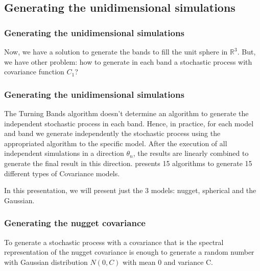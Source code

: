 \documentclass{beamer}
\begin{document}
\subsection{Generating the unidimensional simulations}

\begin{frame}
 \frametitle{Generating the unidimensional simulations}
 Now, we have a solution to generate the bands to fill the unit sphere in $\mathbb{R}^3$. But, we have other problem:
 how to generate in each band a stochastic process with covariance function $C_1$?
\end{frame}

\begin{frame}
 \frametitle{Generating the unidimensional simulations}
 
 The Turning Bands algorithm doesn't determine an algorithm to generate the independent stochastic process in each band. 
 Hence, in practice, for each model and band we generate independently the stochastic process using the appropriated 
 algorithm to the specific model. After the execution of all independent simulations in a direction $\theta_n$, 
 the results are linearly combined to generate the final result in this direction. \cite{e2006} presents 15 algorithms
 to generate 15 different types of Covariance models.
 
 In this presentation, we will present just the 3 models: nugget, spherical and the Gaussian.
\end{frame}


\begin{frame}
 \frametitle{Generating the nugget covariance}
 To generate a stochastic process with a covariance that is the spectral representation of the nugget covariance is enough to
 generate a random number with Gaussian distribution $N(0, C)$ with mean 0 and variance C.
\end{frame}
\end{document}
